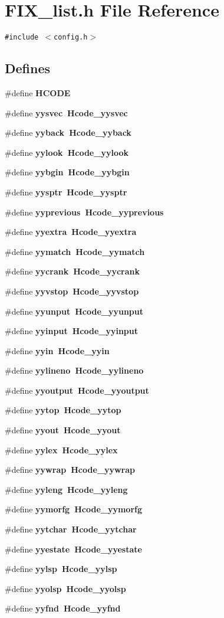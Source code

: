 \section{FIX\_\-list.h File Reference}
\label{FIX__list_8h}
{\tt \#include $<$config.h$>$}\par
\subsection*{Defines}
\begin{CompactItemize}
\item 
\#define \bf{HCODE}
\item 
\#define \bf{yysvec}~Hcode\_\-yysvec
\item 
\#define \bf{yyback}~Hcode\_\-yyback
\item 
\#define \bf{yylook}~Hcode\_\-yylook
\item 
\#define \bf{yybgin}~Hcode\_\-yybgin
\item 
\#define \bf{yysptr}~Hcode\_\-yysptr
\item 
\#define \bf{yyprevious}~Hcode\_\-yyprevious
\item 
\#define \bf{yyextra}~Hcode\_\-yyextra
\item 
\#define \bf{yymatch}~Hcode\_\-yymatch
\item 
\#define \bf{yycrank}~Hcode\_\-yycrank
\item 
\#define \bf{yyvstop}~Hcode\_\-yyvstop
\item 
\#define \bf{yyunput}~Hcode\_\-yyunput
\item 
\#define \bf{yyinput}~Hcode\_\-yyinput
\item 
\#define \bf{yyin}~Hcode\_\-yyin
\item 
\#define \bf{yylineno}~Hcode\_\-yylineno
\item 
\#define \bf{yyoutput}~Hcode\_\-yyoutput
\item 
\#define \bf{yytop}~Hcode\_\-yytop
\item 
\#define \bf{yyout}~Hcode\_\-yyout
\item 
\#define \bf{yylex}~Hcode\_\-yylex
\item 
\#define \bf{yywrap}~Hcode\_\-yywrap
\item 
\#define \bf{yyleng}~Hcode\_\-yyleng
\item 
\#define \bf{yymorfg}~Hcode\_\-yymorfg
\item 
\#define \bf{yytchar}~Hcode\_\-yytchar
\item 
\#define \bf{yyestate}~Hcode\_\-yyestate
\item 
\#define \bf{yylsp}~Hcode\_\-yylsp
\item 
\#define \bf{yyolsp}~Hcode\_\-yyolsp
\item 
\#define \bf{yyfnd}~Hcode\_\-yyfnd
\end{CompactItemize}


